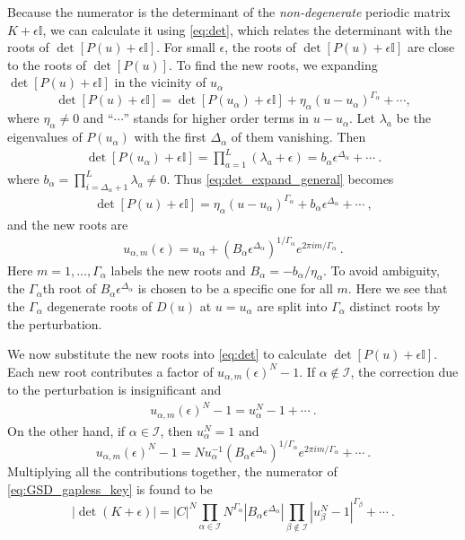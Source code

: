 \documentclass[aps,prb,twocolumn,superscriptaddress,floatfix,10pt,nofootinbib]{revtex4-2}
\newcommand{\ie}{\begin{equation}\begin{aligned}}
\newcommand{\fe}{\end{aligned}\end{equation}}
\theoremstyle{definition}
\begin{document}
Because the numerator is the determinant of the \textit{non-degenerate} periodic matrix $K+\epsilon\mathbb{I}$, we can calculate it using \eqref{eq:det}, which relates the determinant with the roots of $\det[P(u)+\epsilon\mathbb{I}]$.
For small $\epsilon$, the roots of $\det[P(u)+\epsilon\mathbb{I}]$ are close to the roots of $\det[P(u)]$. To find the new roots, we expanding $\det[P(u)+\epsilon\mathbb{I}]$ in the vicinity of $u_\alpha$
\begin{equation}\label{eq:det_expand_general}
\det[P(u)+\epsilon\mathbb{I}]=\det[P(u_\alpha)+\epsilon\mathbb{I}]+\eta_\alpha (u-u_\alpha)^{\Gamma_\alpha}+\cdots,
\end{equation}
where $\eta_\alpha\neq0$ and ``$\cdots$'' stands for higher order terms in $u-u_\alpha$. Let $\lambda_a$ be the eigenvalues of $P(u_\alpha)$ with the first $\Delta_\alpha$ of them vanishing.
Then
\ie
\det[P(u_\alpha)+\epsilon\mathbb{I}]=\prod_{a=1}^L (\lambda_a+\epsilon)=b_\alpha\epsilon^{\Delta_\alpha}+\cdots~.
\fe
where
$b_{\alpha}=\prod_{i=\Delta_\alpha+1}^L \lambda_a\neq0$. 
Thus \eqref{eq:det_expand_general} becomes
\ie
\det[P(u)+\epsilon\mathbb{I}]=\eta_\alpha (u-u_\alpha)^{\Gamma_\alpha}+b_{\alpha}\epsilon^{\Delta_\alpha}+\cdots~,
\fe
and the new roots are 
\ie
u_{\alpha,m}(\epsilon)=u_\alpha+\left(B_\alpha \epsilon^{\Delta_\alpha}\right)^{1/\Gamma_\alpha}e^{2\pi im/\Gamma_\alpha}~.
\fe
Here $m=1,\ldots,\Gamma_\alpha$ labels the new roots and $B_\alpha=-b_{\alpha}/\eta_\alpha$. To avoid ambiguity, the $\Gamma_\alpha$th root of $B_\alpha \epsilon^{\Delta_\alpha}$ is chosen to be a specific one for all $m$. Here we see that the $\Gamma_\alpha$ degenerate roots of $D(u)$ at $u=u_\alpha$ are split into $\Gamma_\alpha$ distinct roots by the perturbation.

We now substitute the new roots into \eqref{eq:det} to calculate $\det[P(u)+\epsilon\mathbb{I}]$. Each new root contributes a factor of $u_{\alpha,m}(\epsilon)^N-1$. If $\alpha\notin \mathcal{I}$, the correction due to the perturbation is insignificant and
\ie
u_{\alpha,m}(\epsilon)^N-1=u_{\alpha}^N-1+\cdots~.
\fe
On the other hand, if $\alpha\in \mathcal{I}$, then $u_\alpha^N=1$ and
\begin{equation}\label{eq:gapless_root_contribution}
    u_{\alpha,m}(\epsilon)^N-1
    =Nu_\alpha^{-1}\left(B_\alpha \epsilon^{\Delta_\alpha}\right)^{1/\Gamma_\alpha}e^{2\pi im/\Gamma_\alpha}+\cdots~.
\end{equation}
Multiplying all the contributions together, the numerator of \eqref{eq:GSD_gapless_key} is found to be
\begin{equation}\label{eq:GSD_gapless_numerator}
    |\det(K+\epsilon)|=|C|^N \prod_{\alpha\in \mathcal{I}}N^{\Gamma_\alpha}|B_\alpha \epsilon^{\Delta_\alpha}|\prod_{\beta\notin \mathcal{I}}|u_\beta^N-1|^{\Gamma_\beta}+\cdots~.
\end{equation}
\end{document}
